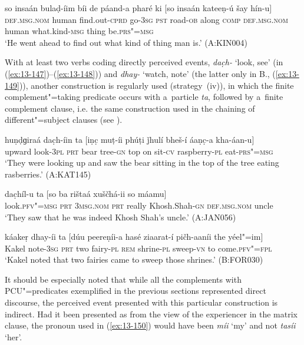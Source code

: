 \begin{exe}
\ex
\label{ex:13-146}
\gll so insaán bulaḍ-íim bíi de páand-a  pharé ki [so insaán kateeṇ-ú
  šay  hín-u] \\
\textsc{def.msg.nom} human find.out-\textsc{cprd} go-\textsc{3sg} \textsc{pst} road-\textsc{ob}  along \textsc{comp} \textsc{def.msg.nom} human what.kind-\textsc{msg} thing be.\textsc{prs"=msg} \\
\glt `He went ahead to find out what kind of thing man is.' (A:KIN004) 
\end{exe}

 With at least two verbs coding directly perceived events, \textit{dac̣h-} `look, see' (in (\ref{ex:13-147})--(\ref{ex:13-148})) and \textit{dhay-} `watch, note' (the latter only in B., (\ref{ex:13-149})), another construction is regularly used (strategy~(iv)), in which the finite complement"=taking predicate occurs with a~particle \textit{ta}, followed by a~finite complement clause, i.e. the same construction used in the chaining of different"=subject clauses (see ). 

\begin{exe}
\ex
\label{ex:13-147}
\gll huṇḍɡiraá dac̣h-íin ta [iṇc̣ muṭ-íi phúṭi ǰhulí  bheš-í áaṇc̣-a kha-áan-u] \\
upward look-\textsc{3pl} \textsc{prt} bear tree-\textsc{gn} top on sit-\textsc{cv} raspberry-\textsc{pl} eat-\textsc{prs"=msg}  \\
\glt `They were looking up and saw the bear sitting in the top of the tree eating rasberries.' (A:KAT145)

\ex
\label{ex:13-148}
\gll dac̣híl-u ta [so ba rištaá  xuščhá-ii so máamu] \\
look.\textsc{pfv"=msg} \textsc{prt} \textsc{3msg.nom} \textsc{prt} really Khosh.Shah-\textsc{gn} \textsc{def.msg.nom} uncle  \\
\glt `They saw that he was indeed Khosh Shah's uncle.' (A:JAN056)

\ex
\label{ex:13-149}
\gll káakeṛ dhay-íi ta [dúu peereṇíi-a hasé ziaarat-í  pičh-aaníi the yéel"=im] \\
Kakel note-\textsc{3sg} \textsc{prt} two fairy-\textsc{pl}  \textsc{rem} shrine-\textsc{pl} sweep-\textsc{vn} to come.\textsc{pfv"=fpl} \\
\glt `Kakel noted that two fairies came to sweep those shrines.' (B:FOR030) 
\end{exe}

It should be especially noted that while all the complements with PCU"=predicates exemplified in the previous sections represented direct discourse, the perceived event presented with this particular construction is indirect. Had it been presented as from the view of the experiencer in the matrix clause, the pronoun used in (\ref{ex:13-150}) would have been \textit{míi} `my' and not \textit{tasíi} `her'.

